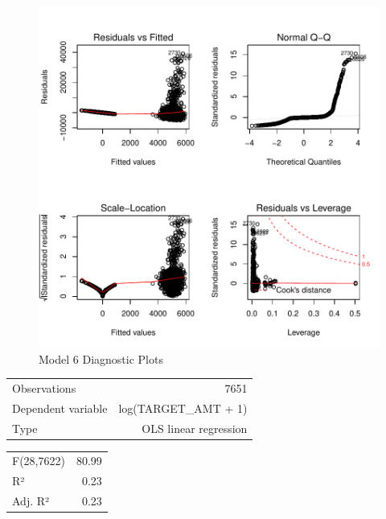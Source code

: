 \documentclass[]{article}
\begin{document}
\begin{figure}
\centering
\includegraphics{proj4_files/figure-latex/f16-1.pdf}
\caption{\label{fig:f16}Model 6 Diagnostic Plots}
\end{figure}

\newpage

\begin{table}[!h]
\centering
\begin{tabular}{lr}
\toprule
\rowcolor{gray!6}  Observations & 7651\\
Dependent variable & log(TARGET\_AMT + 1)\\
\rowcolor{gray!6}  Type & OLS linear regression\\
\bottomrule
\end{tabular}
\end{table}

\begin{table}[!h]
\centering
\begin{tabular}{lr}
\toprule
\rowcolor{gray!6}  F(28,7622) & 80.99\\
R² & 0.23\\
\rowcolor{gray!6}  Adj. R² & 0.23\\
\bottomrule
\end{tabular}
\end{table}
\end{document}
